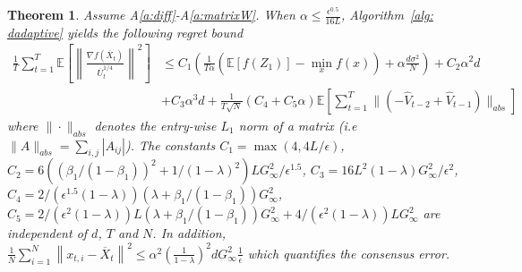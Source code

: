 \documentclass[11pt]{article}
\newtheorem{theorem}{Theorem}
\begin{document}
\begin{theorem}\label{thm: dagm_converge}
Assume A\ref{a:diff}-A\ref{a:matrixW}. %
	When $\alpha  \leq \frac{\epsilon^{0.5}}{16L} $, 
	  Algorithm~\ref{alg: dadaptive} yields the following regret bound
	  {\small
	\begin{align}\label{eq: thm11}
\frac{1}{T}\sum_{t=1}^T  \mathbb E \left [\left\|\frac{\nabla f( \overline X_{t})}{\overline U_{t}^{1/4}}\right\|^2  \right]
&	\leq   C_1\left(\frac{1}{T\alpha} ( \mathbb E  [f( Z_{1})]  -  \min_x  f(x)) +  \alpha  \frac{d\sigma^2}{N}\right) +  C_2 \alpha^2 d 
	\nonumber \\
    &+ C_3 \alpha^3d  + \frac{1}{T\sqrt{N}} (C_4 +  C_5 \alpha)  \mathbb E \left[ \sum_{t=1}^{T}   \|    (- \hat V_{t-2} + \hat V_{t-1} ) \|_{abs} \right] 
	\end{align}
	}%
where $\| \cdot\|_{abs}$  denotes the entry-wise $L_1$ norm of a matrix (i.e $\| A\|_{abs} = \sum_{i,j}{|A_{ij}|}$). The constants $C_1 =  \max (4, 4{L/\epsilon})$,
	$C_2 =  6 (( \beta_1/(1-\beta_1))^2 + 1/(1-\lambda)^2 )L  G_{\infty}^2 /\epsilon^{1.5}$,
	$C_3 =  16L^2  (1-\lambda) G_{\infty}^2/\epsilon^2$,
	$C_4 =   2/ (\epsilon^{1.5}(1-\lambda)) (     \lambda + \beta_1/(1-\beta_1)) G_{\infty}^2$,
	$C_5 =   2/ (\epsilon^{2}(1-\lambda))   L  (\lambda + \beta_1/(1-\beta_1)) G_{\infty}^2  + 4/ (\epsilon^{2}(1-\lambda))   L    G_{\infty}^2$ are independent of $d$, $T$ and $N$. In addition, $\frac{1}{N}\sum_{i=1}^N\left\| {  x_{t,i} -   \overline X_{t}}  \right\|^2   \leq \alpha^2 \left (\frac{1}{1-\lambda} \right)^2 d G_{\infty}^2 \frac{1}{\epsilon}$ which quantifies the consensus error.
\end{theorem}

\newpage
\end{document}
